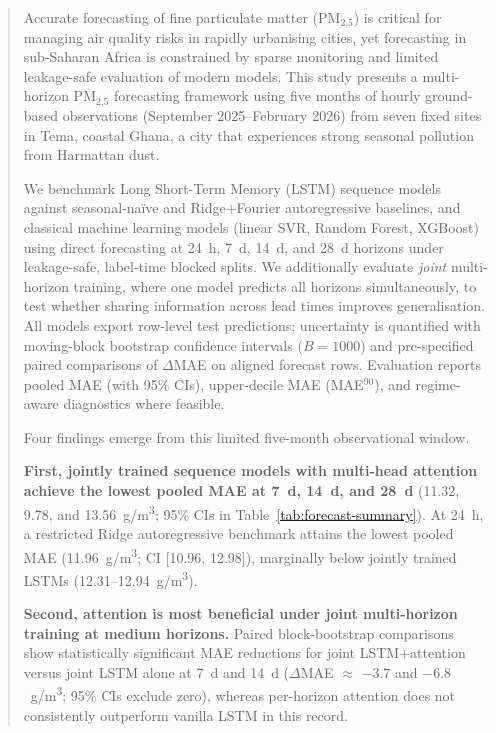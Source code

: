 \documentclass[a4paper,fleqn]{cas-sc}
\begin{document}

\begin{abstract}
Accurate forecasting of fine particulate matter (PM$_{2.5}$) is critical for managing air quality risks in rapidly urbanising cities, yet forecasting in sub-Saharan Africa is constrained by sparse monitoring and limited leakage-safe evaluation of modern models. This study presents a multi-horizon PM$_{2.5}$ forecasting framework using five months of hourly ground-based observations (September 2025--February 2026) from seven fixed sites in Tema, coastal Ghana, a city that experiences strong seasonal pollution from Harmattan dust.

We benchmark Long Short-Term Memory (LSTM) sequence models against seasonal-na\"{i}ve and Ridge+Fourier autoregressive baselines, and classical machine learning models (linear SVR, Random Forest, XGBoost) using direct forecasting at 24~h, 7~d, 14~d, and 28~d horizons under leakage-safe, label-time blocked splits. We additionally evaluate \emph{joint} multi-horizon training, where one model predicts all horizons simultaneously, to test whether sharing information across lead times improves generalisation. All models export row-level test predictions; uncertainty is quantified with moving-block bootstrap confidence intervals ($B{=}1000$) and pre-specified paired comparisons of $\Delta$MAE on aligned forecast rows. Evaluation reports pooled MAE (with 95\% CIs), upper-decile MAE (MAE$^{90}$), and regime-aware diagnostics where feasible.

Four findings emerge from this limited five-month observational window.

\textbf{First, jointly trained sequence models with multi-head attention achieve the lowest pooled MAE at 7~d, 14~d, and 28~d} (11.32, 9.78, and 13.56~\textmu g/m\textsuperscript{3}; 95\% CIs in Table~\ref{tab:forecast-summary}). At 24~h, a restricted Ridge autoregressive benchmark attains the lowest pooled MAE (11.96~\textmu g/m\textsuperscript{3}; CI [10.96, 12.98]), marginally below jointly trained LSTMs (12.31--12.94~\textmu g/m\textsuperscript{3}).

\textbf{Second, attention is most beneficial under joint multi-horizon training at medium horizons.} Paired block-bootstrap comparisons show statistically significant MAE reductions for joint LSTM+attention versus joint LSTM alone at 7~d and 14~d ($\Delta$MAE $\approx$ $-3.7$ and $-6.8$~\textmu g/m\textsuperscript{3}; 95\% CIs exclude zero), whereas per-horizon attention does not consistently outperform vanilla LSTM in this record.


\end{abstract}
\end{document}
